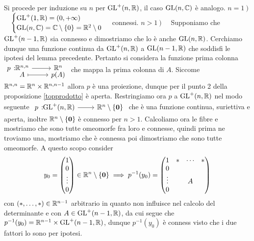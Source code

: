 \begin{theorema}
\end{theorema}
\begin{demonstration}
	Si procede per induzione su $n$ per $\operatorname{GL}^+(n,\mathbb{R})$, il caso $\operatorname{GL}(n,\mathbb{C})$ è analogo.\newline
	$n=1 \ )$ \ \ $\begin{cases}
			\operatorname{GL}^+(1,\mathbb{R})=(0,+\infty) \\
			\operatorname{GL}(n,\mathbb{C})=\mathbb{C}\setminus\{0\}=\mathbb{R}^2\setminus{0}
		\end{cases}$ connessi.\newline
	$n>1 \ )$ \ \ Supponiamo che $\operatorname{GL}^+(n-1,\mathbb{R})$ sia connesso e dimostriamo che lo è anche $\operatorname{GL}(n,\mathbb{R})$. Cerchiamo dunque una funzione continua da $\operatorname{GL}^+(n,\mathbb{R})$  a $\operatorname{GL}(n-1,\mathbb{R})$ che soddisfi le ipotesi del lemma precedente. Pertanto si considera la funzione prima colonna $\displaystyle \funztot p {\realset^{n,n}} {\realset^n} A {p(A)}$ che mappa la prima colonna di $A$. Siccome $\mathbb{R}^{n,n}=\mathbb{R}^n\times\mathbb{R}^{n,n-1}$ allora $p$ è una proiezione, dunque per il punto 2 della proposizione \ref{topprodotto}	è aperta. Restringiamo ora $p$ a $\operatorname{GL}^+(n,\mathbb{R})$ nel modo seguente $\funz p {\gl^+(n,\realset)} {\realset^n\setminus\{\mathbf{0}\}}$ che è una funzione continua, suriettiva e aperta, inoltre $\mathbb{R}^n\setminus\{\mathbf{0}\}$ è connesso per $n>1$. Calcoliamo ora le fibre e mostriamo che sono tutte omeomorfe fra loro e connesse, quindi prima ne troviamo una, mostriamo che è connessa poi dimostriamo che sono tutte omeomorfe. A questo scopo consider
		\begin{gather*}
			y_0=\begin{pmatrix}
					1 \\ 0 \\ \vdots \\ 0
				\end{pmatrix}\in \mathbb{R}^n\setminus\{\mathbf{0}\} \implies p^{-1}	(y_0)=\begin{pmatrix}
						1      & * & \cdots & *\\
						0      &   &       &  \\
						\vdots &   & A     &  \\
						0      &   &       &
					\end{pmatrix}
		\end{gather*}
	con $(*,\dots, *)\in\mathbb{R}^{n-1}$ arbitrario in quanto non influisce nel calcolo del determinante e con $A\in\operatorname{GL}^+(n-1,\mathbb{R})$, da cui segue che $p^{-1}(y_0)=\mathbb{R}^{n-1}\times\operatorname{GL}^+(n-1,\mathbb{R})$, dunque $p^{-1}(y_0)$ è conness visto che i due fattori lo sono per ipotesi.\newline

\end{demonstration}
